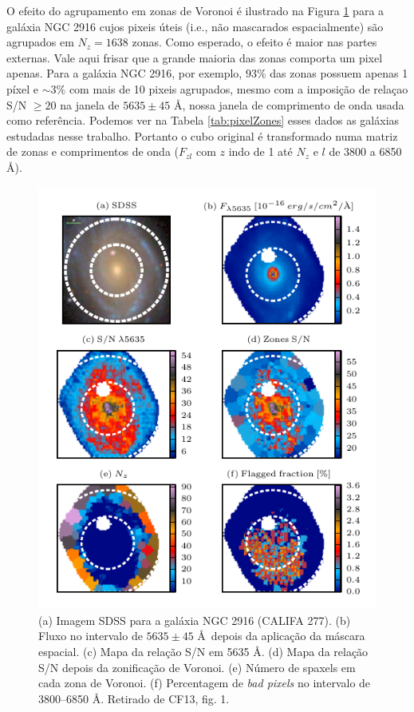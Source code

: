 O efeito do agrupamento em zonas de Voronoi é ilustrado na Figura \ref{fig:zonesfig1CF13} para a galáxia NGC 2916 cujos
pixeis úteis (i.e., não mascarados espacialmente) são agrupados em $N_z = 1638$ zonas. Como esperado, o efeito é maior
nas partes externas. Vale aqui frisar que a grande maioria das zonas comporta um pixel apenas. Para a galáxia NGC 2916,
por exemplo, $93\%$ das zonas possuem apenas 1 píxel e $\sim 3\%$ com mais de 10 pixeis agrupados, mesmo com a imposição
de relaçao S/N $\ge 20$ na janela de $5635 \pm 45$ \AA, nossa janela de comprimento de onda usada como referência.
Podemos ver na Tabela \ref{tab:pixelZones} esses dados as galáxias estudadas nesse trabalho. Portanto o cubo original é
transformado numa matriz de zonas e comprimentos de onda ($F_{zl}$ com $z$ indo de 1 até $N_z$ e $l$ de 3800 a 6850
\AA).

\begin{figure}
	\includegraphics[width=1.0\textwidth]{figuras/figCF13fig1.pdf}
    \caption[Máscara espacial, zonas de Voronoi e flags para a galáxia NGC 2916 (CALIFA 277).]
    {(a) Imagem SDSS para a galáxia NGC 2916 (CALIFA 277). (b) Fluxo no intervalo de $5635 \pm 45$ \AA\ depois da
    aplicação da máscara espacial. (c) Mapa da relação S/N em 5635 \AA. (d) Mapa da relação S/N depois da zonificação de
    Voronoi. (e) Número de spaxels em cada zona de Voronoi. (f) Percentagem de {\em bad pixels} no intervalo
    de 3800--6850 \AA. Retirado de CF13, fig. 1.}
   	\label{fig:zonesfig1CF13}
\end{figure}

